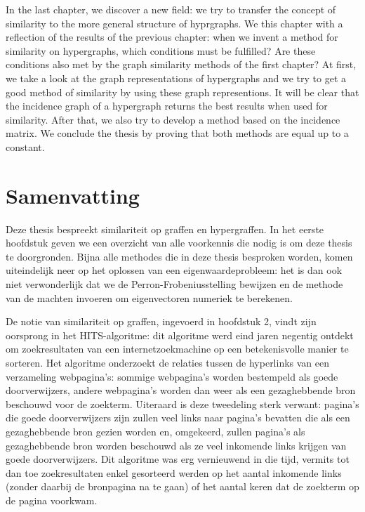 \documentclass[a4paper,11pt]{report}
\begin{document}
In the last chapter, we discover a new field: we try to transfer the concept of similarity to the more
general structure of hyprgraphs. We this chapter with a reflection of the results of the previous chapter:
when we invent a method for similarity on hypergraphs, which conditions must be fulfilled? Are these conditions
also met by the graph similarity methods of the first chapter? At first, we take a look at the graph 
representations of hypergraphs and we try to get a good method of similarity by 
using these graph representions. It will be clear that the incidence graph of a 
hypergraph returns the best results when used for similarity. After that, we 
also try to develop a method based on the incidence matrix. We conclude the 
thesis by proving that both methods are equal up to a constant.



\chapter*{Samenvatting}
Deze thesis bespreekt similariteit op graffen en hypergraffen. In het eerste 
hoofdstuk geven we een overzicht van alle voorkennis die nodig is om deze thesis 
te doorgronden. Bijna alle methodes die in deze thesis besproken worden, komen 
uiteindelijk neer op het oplossen van een eigenwaardeprobleem: het is dan ook 
niet verwonderlijk dat we de Perron-Frobeniusstelling bewijzen en de methode van 
de machten invoeren om eigenvectoren numeriek te berekenen.


De notie van 
similariteit op graffen, ingevoerd in hoofdstuk 2, vindt zijn oorsprong in het HITS-algoritme: dit algoritme 
werd eind jaren negentig ontdekt om zoekresultaten van een internetzoekmachine op een betekenisvolle manier 
te sorteren. Het algoritme onderzoekt de relaties tussen de hyperlinks van een verzameling webpagina's: sommige webpagina's worden 
bestempeld als goede doorverwijzers, andere webpagina's worden dan weer als een gezaghebbende bron beschouwd voor de zoekterm. 
Uiteraard is deze tweedeling sterk verwant: pagina's die goede doorverwijzers 
zijn zullen veel links naar pagina's bevatten die als een gezaghebbende bron 
gezien worden en, omgekeerd, zullen pagina's als gezaghebbende bron worden 
beschouwd als ze veel inkomende links krijgen van goede doorverwijzers. Dit 
algoritme was erg vernieuwend in die tijd, vermits tot dan toe zoekresultaten 
enkel gesorteerd werden op het aantal inkomende links (zonder daarbij de bronpagina na te gaan) 
of het aantal keren dat de zoekterm op de pagina voorkwam.
\end{document}
